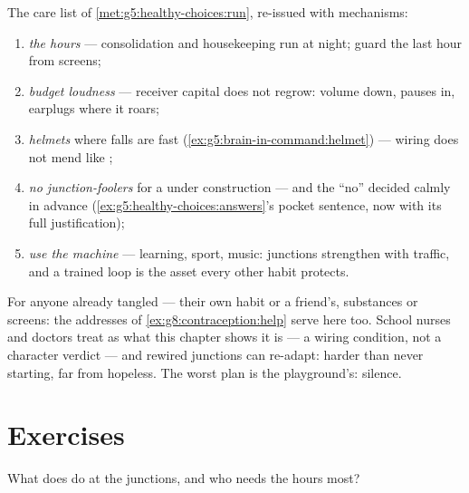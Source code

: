 \begin{method}\label{met:g8:protecting-the-nervous-system:manual}
The care list of \cref{met:g5:healthy-choices:run},
re-issued with mechanisms:
\begin{enumerate}
  \item \emph{ the hours} --- consolidation and
        housekeeping run at night; guard the last hour
        from screens;
  \item \emph{budget loudness} --- receiver capital does
        not regrow: volume down, pauses in, earplugs
        where it roars;
  \item \emph{helmets} where falls are fast
        (\cref{ex:g5:brain-in-command:helmet}) --- wiring
        does not mend like ;
  \item \emph{no junction-foolers} for a  under
        construction --- and the ``no'' decided calmly in
        advance
        (\cref{ex:g5:healthy-choices:answers}'s pocket
        sentence, now with its full justification);
  \item \emph{use the machine} --- learning, sport,
        music: junctions strengthen with traffic, and a
        trained loop is the asset every other habit
        protects.
\end{enumerate}
\end{method}

\begin{example}\label{ex:g8:protecting-the-nervous-system:help}
For anyone already tangled --- their own habit or a
friend's, substances or screens: the addresses of
\cref{ex:g8:contraception:help} serve here too. School
nurses and doctors treat  as what this chapter
shows it is --- a wiring condition, not a character
verdict --- and rewired junctions can re-adapt: harder
than never starting, far from hopeless. The worst plan
is the playground's: silence.
\end{example}

\section{Exercises}

\begin{exercise}[$\star$]\label{exo:g8:protecting-the-nervous-system:1}
What does  do at the junctions, and who needs the
hours most?
\end{exercise}

